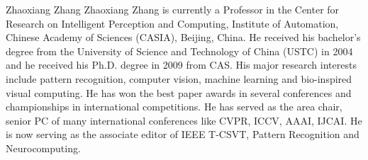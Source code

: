 \documentclass[journal]{IEEEtran}
\begin{document}
\vspace{-40px}
\begin{IEEEbiography}{Zhaoxiang Zhang}
Zhaoxiang Zhang is currently a Professor in the Center for Research on Intelligent Perception and Computing, Institute of Automation, Chinese Academy of Sciences (CASIA), Beijing, China. He received his bachelor's degree from the University of Science and Technology of China (USTC) in 2004 and he received his Ph.D. degree in 2009 from CAS. His major research interests include pattern recognition, computer vision, machine learning and bio-inspired visual computing. He has won the best paper awards in several conferences and championships in international competitions. He has served as the area chair, senior PC of many international conferences like CVPR, ICCV, AAAI, IJCAI. He is now serving as the associate editor of IEEE T-CSVT, Pattern Recognition and Neurocomputing.
\end{IEEEbiography}





\fi
\end{document}
